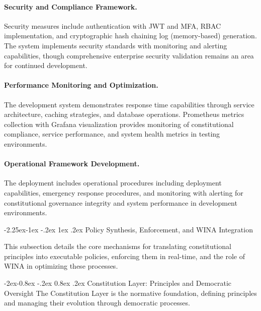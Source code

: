\documentclass[manuscript,screen,9pt]{acmart}
\makeatletter
\renewcommand\subsection{\@startsection{subsection}{2}{\z@}%
  {-2.25ex\@plus -1ex \@minus -.2ex}%
  {1ex \@plus .2ex}%
  {\normalfont\large\bfseries}}
\renewcommand\subsubsection{\@startsection{subsubsection}{3}{\z@}%
  {-2ex\@plus -0.8ex \@minus -.2ex}%
  {0.8ex \@plus .2ex}%
  {\normalfont\normalsize\bfseries}}
\makeatother
\begin{document}
\paragraph{Security and Compliance Framework.} Security measures include authentication with JWT and MFA, RBAC implementation, and cryptographic hash chaining log (memory-based) generation. The system implements security standards with monitoring and alerting capabilities, though comprehensive enterprise security validation remains an area for continued development.

\paragraph{Performance Monitoring and Optimization.} The development system demonstrates response time capabilities through service architecture, caching strategies, and database operations. Prometheus metrics collection with Grafana visualization provides monitoring of constitutional compliance, service performance, and system health metrics in testing environments.

\paragraph{Operational Framework Development.} The deployment includes operational procedures including deployment capabilities, emergency response procedures, and monitoring with alerting for constitutional governance integrity and system performance in development environments.

\subsection{Policy Synthesis, Enforcement, and WINA Integration}
\label{subsec:policy_synthesis_enforcement} 

This subsection details the core mechanisms for translating constitutional principles into executable policies, enforcing them in real-time, and the role of WINA in optimizing these processes.

\subsubsection{Constitution Layer: Principles and Democratic Oversight}
\label{subsubsec:constitution_layer}
The Constitution Layer is the normative foundation, defining principles and managing their evolution through democratic processes.
\end{document}
